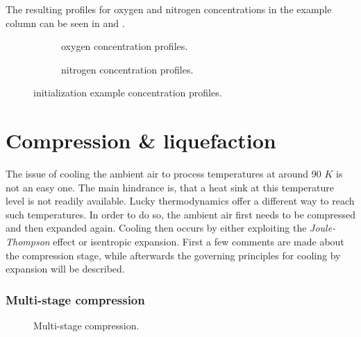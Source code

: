 
        The resulting profiles for oxygen and nitrogen concentrations in the example column can be seen
        in  and .

        \begin{figure}
            \scriptsize
            \hspace{0.01\textwidth}
            \begin{subfigure}{0.45\textwidth}
                
                \caption{oxygen concentration profiles.}
                \label{fig:lpc_example_o2}
            \end{subfigure}
            \hfill
            \begin{subfigure}{0.45\textwidth}
                
                \caption{nitrogen concentration profiles.}
                \label{fig:lpc_example_n2}
            \end{subfigure}
            \hspace{0.01\textwidth}
            \caption{initialization example concentration profiles.}
        \end{figure}

\section{Compression \& liquefaction}
\label{sec:comp_liq}
    The issue of cooling the ambient air to process temperatures at around 90 $K$ is not an easy
    one. The main hindrance is, that a heat sink at this temperature level is not readily available.
    Lucky thermodynamics offer a different way to reach such temperatures. In order to do so,
    the ambient air first needs to be compressed and then expanded again. Cooling then occurs
    by either exploiting the \emph{Joule-Thompson} effect or isentropic expansion. First a few
    comments are made about the compression stage, while afterwards the governing principles
    for cooling by expansion will be described.

    \subsubsection{Multi-stage compression}
        \begin{figure}
            \center
            
            \caption{Multi-stage compression.}
            \label{fig:multi_stage_compression}
        \end{figure}

